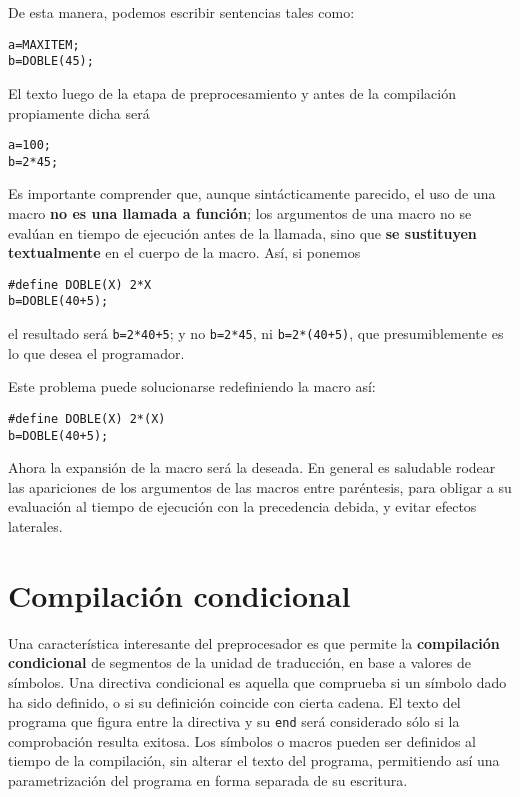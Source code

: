 De esta manera, podemos escribir sentencias tales como:
\begin{lstlisting}
a=MAXITEM;
b=DOBLE(45);
\end{lstlisting}
El texto luego de la etapa de preprocesamiento y antes de la compilación propiamente dicha será
\begin{lstlisting}
a=100;
b=2*45;
\end{lstlisting}


Es importante comprender que, aunque sintácticamente parecido, el uso de una macro \textbf{no es una
llamada a función}; los argumentos de una macro no se evalúan en tiempo de ejecución antes de la
llamada, sino que \textbf{se sustituyen textualmente} en el cuerpo de la macro. Así, si ponemos
\begin{lstlisting}
#define DOBLE(X) 2*X
b=DOBLE(40+5);
\end{lstlisting}
el resultado será \texttt{b=2*40+5}; y no \texttt{b=2*45}, ni \texttt{b=2*(40+5)}, que presumiblemente es lo que desea el
programador.

Este problema puede solucionarse redefiniendo la macro así:
\begin{lstlisting}
#define DOBLE(X) 2*(X)
b=DOBLE(40+5);
\end{lstlisting}
Ahora la expansión de la macro será la deseada. En general es saludable rodear las apariciones de los
argumentos de las macros entre paréntesis, para obligar a su evaluación al tiempo de ejecución con la
precedencia debida, y evitar efectos laterales.


\section{Compilación condicional}

Una característica interesante del preprocesador es que permite la \textbf{compilación condicional} de segmentos de la unidad de traducción, en base a valores de símbolos. Una directiva condicional es aquella que comprueba si un símbolo dado ha sido definido, o si su definición coincide con cierta cadena. El texto del programa que figura entre la directiva y su \texttt{end} será considerado sólo si la comprobación resulta exitosa. Los símbolos o macros pueden ser definidos al tiempo de la compilación, sin alterar el texto del programa, permitiendo así una parametrización del programa en forma separada de su escritura.

